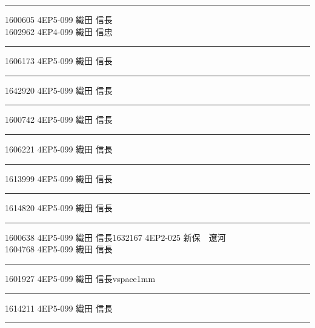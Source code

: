 \documentclass[a4paper,twocolumn,dvipdfmx,uplatex]{utarticle}
\begin{document}
\hrule
\vspace{1mm}
\hspace{1cm}1600605	4EP5-099 織田 信長\\\hspace{1cm}1602962	4EP4-099 織田 信忠\vspace{1mm}%
\hrule\par\vspace{1mm}
\hspace{1cm}1606173	4EP5-099 織田 信長\vspace{1mm}
\vspace{0.6cm}
\hrule\par\vspace{1mm}
\hspace{1cm}1642920	4EP5-099 織田 信長\vspace{1mm}%
\vspace{0.6cm}
\hrule\par\vspace{1mm}
\hspace{1cm}1600742	4EP5-099 織田 信長\vspace{1mm} %
\vspace{0.6cm}
\hrule\par\vspace{1mm}
\hspace{1cm}1606221	4EP5-099 織田 信長\vspace{1mm} %
\vspace{0.6cm}
\hrule\par\vspace{1mm}
\hspace{1cm}1613999	4EP5-099 織田 信長\vspace{1mm} %
\vspace{0.6cm}
\hrule\par\vspace{1mm}
\hspace{1cm}1614820	4EP5-099 織田 信長\vspace{1mm} %
\vspace{0.6cm}
\hrule\par\vspace{1mm}
\hspace{1cm}1600638	4EP5-099 織田 信長\hspace{1cm}1632167	4EP2-025 新保　遼河\\ %
\hspace{1cm}1604768	4EP5-099 織田 信長\vspace{1mm}
\hrule\par\vspace{1mm}
\hspace{1cm}1601927	4EP5-099 織田 信長vspace{1mm} %
\vspace{0.6cm}
\hrule\par\vspace{1mm}
\hspace{1cm}1614211	4EP5-099 織田 信長\vspace{1mm} %
\vspace{0.6cm}\hrule
\end{document}
